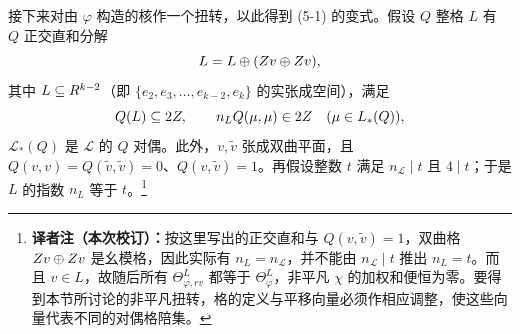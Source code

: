 接下来对由 $\varphi$ 构造的核作一个扭转，以此得到 (5-1) 的变式。假设 $Q$ 整格 $L$ 有 $Q$ 正交直和分解
\[
 L=L\oplus(Z v\oplus Zv),
\]
其中 $L\subseteq R^{k-2}$（即 $\{e_2,e_3,\ldots,e_{k-2},e_k\}$ 的实张成空间），满足
\[
 Q(L)\subseteq2Z,\qquad n_{L}Q(\mu,\mu)\in2Z
 \quad(\mu\in L_*(Q)),
\]
$\mathcal L_*(Q)$ 是 $\mathcal L$ 的 $Q$ 对偶。此外，$v,\widetilde v$ 张成双曲平面，且
$Q(v,v)=Q(\widetilde v,\widetilde v)=0$、$Q(v,\widetilde v)=1$。再假设整数 $t$ 满足
$n_{\mathcal L}\mid t$ 且 $4\mid t$；于是 $L$ 的指数 $n_L$ 等于 $t$。\footnote{\textbf{译者注（本次校订）：}按这里写出的正交直和与 $Q(v,\widetilde v)=1$，双曲格 $Z v\oplus Zv$ 是幺模格，因此实际有 $n_L=n_{\mathcal L}$，并不能由 $n_{\mathcal L}\mid t$ 推出 $n_L=t$。而且 $v\in L$，故随后所有 $\Theta_{\varphi,rv}^L$ 都等于 $\Theta_\varphi^L$，非平凡 $\chi$ 的加权和便恒为零。要得到本节所讨论的非平凡扭转，格的定义与平移向量必须作相应调整，使这些向量代表不同的对偶格陪集。}

